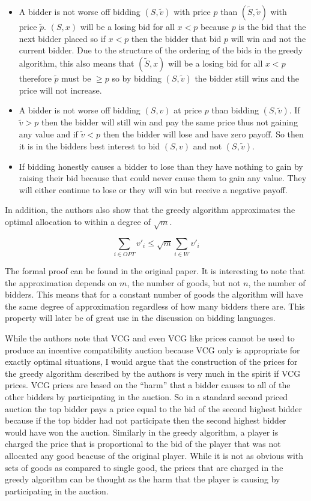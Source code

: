 \documentclass[10pt,onecolumn,letterpaper]{article}
\theoremstyle{definition}
\begin{document}
\begin{itemize}
	\item A bidder is not worse off bidding $(S, \tilde{v})$ with price $p$ than $(\tilde{S}, \tilde{v})$ with price $\tilde{p}$. $(S,x)$ will be a losing bid for all $x < p$ because $p$ is the bid that the next bidder placed so if $x < p$ then the bidder that bid $p$ will win and not the current bidder. Due to the structure of the ordering of the bids in the greedy algorithm, this also means that $(\tilde{S}, x)$ will be a losing bid for all $x < p$ therefore $\tilde{p}$ must be $ \geq p$ so by bidding $(S, \tilde{v})$ the bidder still wins and the price will not increase. 
	
	\item A bidder is not worse off bidding $(S, v)$ at price $p$ than bidding $(S, \tilde{v})$. If $\tilde{v} > p$ then the bidder will still win and pay the same price thus not gaining any value and if $\tilde{v} < p$ then the bidder will lose and have zero payoff. So then it is in the bidders best interest to bid $(S,v)$ and not $(S, \tilde{v})$.

	\item If bidding honestly causes a bidder to lose than they have nothing to gain by raising their bid because that could never cause them to gain any value. They will either continue to lose or they will win but receive a negative payoff.
\end{itemize}

In addition, the authors also show that the greedy algorithm approximates the optimal allocation to within a degree of $\sqrt{m}$.

$$\sum_{i \in OPT} v'_i \leq \sqrt{m} \sum_{i \in W} v'_i $$

The formal proof can be found in the original paper. It is interesting to note that the approximation depends on $m$, the number of goods, but not $n$, the number of bidders. This means that for a constant number of goods the algorithm will have the same degree of approximation regardless of how many bidders there are. This property will later be of great use in the discussion on bidding languages. 

While the authors note that VCG and even VCG like prices cannot be used to produce an incentive compatibility auction because VCG only is appropriate for exactly optimal situations, I would argue that the construction of the prices for the greedy algorithm described by the authors is very much in the spirit if VCG prices. VCG prices are based on the ``harm'' that a bidder causes to all of the other bidders by participating in the auction. So in a standard second priced auction the top bidder pays a price equal to the bid of the second highest bidder because if the top bidder had not participate then the second highest bidder would have won the auction. Similarly in the greedy algorithm, a player is charged the price that is proportional to the bid of the player that was not allocated any good beacuse of the original player. While it is not as obvious with sets of goods as compared to single good, the prices that are charged in the greedy algorithm can be thought as the harm that the player is causing by participating in the auction. 
\end{document}
